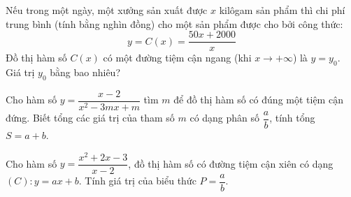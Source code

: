 \begin{ex}
    Nếu trong một ngày, một xưởng sản xuất được $x$ kilôgam sản phẩm thì chi phí trung bình (tính bằng nghìn đồng) cho một sản phẩm được cho bởi công thức:
    $$
    y=C(x)=\dfrac{50x+2000}{x}
    $$
    Đồ thị hàm số $C(x)$ có một đường tiệm cận ngang (khi $x \to +\infty$) là $y=y_0$. Giá trị $y_0$ bằng bao nhiêu?\\
\end{ex}

\begin{ex}%
    Cho hàm số $y=\dfrac{x-2}{x^2-3mx+m}$ tìm $m$ để đồ thị hàm số có đúng một tiệm cận đứng. Biết tổng các giá trị của tham số $m$ có dạng phân số $\dfrac{a}{b}$, tính tổng $S=a+b$.\\
\end{ex}

\begin{ex}%
    Cho hàm số $y=\dfrac{x^2+2x-3}{x-2}$, đồ thị hàm số có đường tiệm cận xiên có dạng $(C) \colon y=ax+b$. Tính giá trị của biểu thức $P=\dfrac{a}{b}$.\\
\end{ex}

